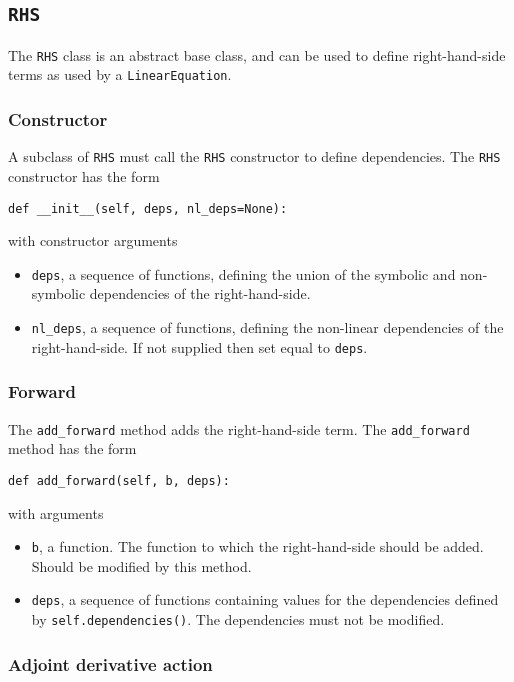 \documentclass[11pt]{article}
\begin{document}
\subsection{\texttt{RHS}}

The \texttt{RHS} class is an abstract base class, and can be used to define
right-hand-side terms as used by a \texttt{LinearEquation}.

\subsubsection{Constructor}

A subclass of \texttt{RHS} must call the \texttt{RHS} constructor to define
dependencies. The \texttt{RHS} constructor has the form
\begin{lstlisting}
def __init__(self, deps, nl_deps=None):
\end{lstlisting}
with constructor arguments
\begin{itemize}
  \item \texttt{deps}, a sequence of functions, defining the union of the
    symbolic and non-symbolic dependencies of the right-hand-side.
  \item \texttt{nl\_deps}, a sequence of functions, defining the non-linear
    dependencies of the right-hand-side. If not supplied then set equal to
    \texttt{deps}.
\end{itemize}

\subsubsection{Forward}

The \texttt{add\_forward} method adds the right-hand-side term. The
\texttt{add\_forward} method has the form
\begin{lstlisting}
def add_forward(self, b, deps):
\end{lstlisting}
with arguments
\begin{itemize}
  \item \texttt{b}, a function. The function to which the right-hand-side
    should be added. Should be modified by this method.
  \item \texttt{deps}, a sequence of functions containing values for the
    dependencies defined by \texttt{self.dependencies()}. The dependencies must
    not be modified.
\end{itemize}

\subsubsection{Adjoint derivative action}
\end{document}

